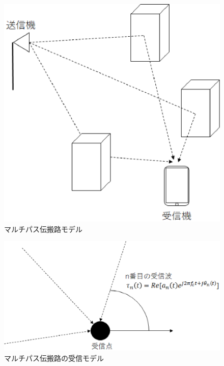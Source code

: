 \begin{figure}[t]
  \begin{center}
    \includegraphics[scale = 0.25]{./chapter2/figure/multipaths.eps}
    \caption{マルチパス伝搬路モデル}
    \label{fig:multipath}
  \end{center}
\end{figure}

\begin{figure}[htbp]
	\begin{center}
		\includegraphics[scale=0.15]{./chapter2/figure/jushin.eps}
		\caption{マルチパス伝搬路の受信モデル}
		\label{fig:coming_waves}
	\end{center}
\end{figure}

